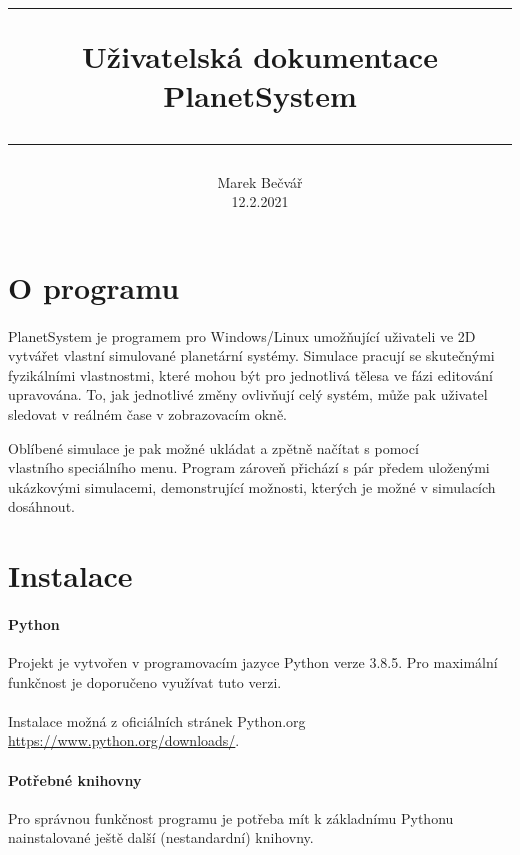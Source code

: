 \documentclass[a4paper, 12pt]{article}
\title{
        \vspace{1in}
        \rule{\linewidth}{0.5pt}
		\usefont{OT1}{bch}{b}{n}
        \huge Uživatelská dokumentace \\PlanetSystem\\
        \vspace{-10pt}
        \rule{\linewidth}{1pt}
}
\author{
		\normalfont\normalsize
        Marek Bečvář\\[-3pt]\normalsize
        12.2.2021
}
\date{}
\begin{document}
\maketitle 
\newpage

\tableofcontents
\newpage

\section{O programu} 
\paragraph{}
PlanetSystem je programem pro Windows/Linux umožňující uživateli ve 2D vytvářet
vlastní simulované planetární systémy. Simulace pracují se skutečnými
fyzikálními vlastnostmi, které mohou být pro jednotlivá tělesa ve fázi
editování upravována. To, jak jednotlivé změny ovlivňují celý systém, může pak
uživatel sledovat v reálném čase v zobrazovacím okně.

Oblíbené simulace je pak možné ukládat a zpětně načítat s pomocí \\vlastního
speciálního menu. Program zároveň přichází s pár předem uloženými ukázkovými
simulacemi, demonstrující možnosti, kterých je možné v simulacích dosáhnout. 

\section{Instalace}
\paragraph{Python}
Projekt je vytvořen v programovacím jazyce Python verze 3.8.5. Pro maximální
funkčnost je doporučeno využívat tuto verzi.
\\\\ Instalace možná z oficiálních stránek Python.org
\url{https://www.python.org/downloads/}.

\paragraph{Potřebné knihovny} Pro správnou funkčnost programu je potřeba mít k
základnímu Pythonu nainstalované ještě další (nestandardní) knihovny. 
\end{document}
